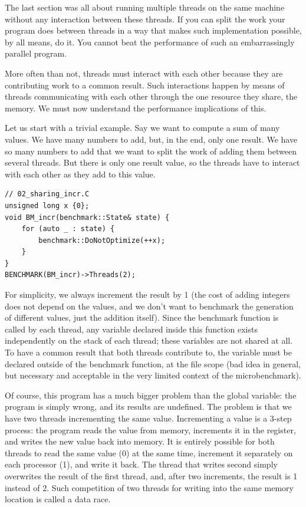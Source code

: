 The last section was all about running multiple threads on the same machine without any interaction between these threads. If you can split the work your program does between threads in a way that makes such implementation possible, by all means, do it. You cannot beat the performance of such an embarrassingly parallel program.

More often than not, threads must interact with each other because they are contributing work to a common result. Such interactions happen by means of threads communicating with each other through the one resource they share, the memory. We must now understand the performance implications of this.

Let us start with a trivial example. Say we want to compute a sum of many values. We have many numbers to add, but, in the end, only one result. We have so many numbers to add that we want to split the work of adding them between several threads. But there is only one result value, so the threads have to interact with each other as they add to this value.

\begin{lstlisting}[style=styleCXX]
// 02_sharing_incr.C
unsigned long x {0};
void BM_incr(benchmark::State& state) {
	for (auto _ : state) {
		benchmark::DoNotOptimize(++x);
	}
}
BENCHMARK(BM_incr)->Threads(2);
\end{lstlisting}

For simplicity, we always increment the result by 1 (the cost of adding integers does not depend on the values, and we don't want to benchmark the generation of different values, just the addition itself). Since the benchmark function is called by each thread, any variable declared inside this function exists independently on the stack of each thread; these variables are not shared at all. To have a common result that both threads contribute to, the variable must be declared outside of the benchmark function, at the file scope (bad idea in general, but necessary and acceptable in the very limited context of the microbenchmark).

Of course, this program has a much bigger problem than the global variable: the program is simply wrong, and its results are undefined. The problem is that we have two threads incrementing the same value. Incrementing a value is a 3-step process: the program reads the value from memory, increments it in the register, and writes the new value back into memory. It is entirely possible for both threads to read the same value (0) at the same time, increment it separately on each processor (1), and write it back. The thread that writes second simply overwrites the result of the first thread, and, after two increments, the result is 1 instead of 2. Such competition of two threads for writing into the same memory location is called a data race. 

